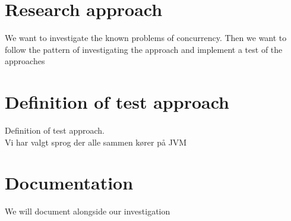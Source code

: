 \makeatletter {}\makeatother
{}
\section{Research approach}
We want to investigate the known problems of concurrency. Then we want to follow the pattern of investigating the approach and implement a test of the approaches

\section{Definition of test approach}
Definition of test approach.\\
Vi har valgt sprog der alle sammen kører på JVM

\section{Documentation}
We will document alongside our investigation


\worksheetend

